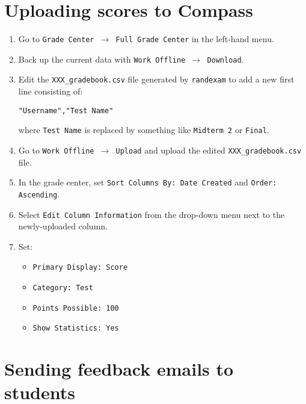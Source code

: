\documentclass{article}
\begin{document}
\section{Uploading scores to Compass}

\begin{enumerate}
\item Go to \texttt{Grade Center $\to$ Full Grade Center} in the
  left-hand menu.
\item Back up the current data with \texttt{Work Offline $\to$
    Download}.
\item Edit the \texttt{XXX_gradebook.csv} file generated by
  \texttt{randexam} to add a new first line consisting of:
  \begin{center}
    \texttt{"Username","Test Name"}
  \end{center}
  where \texttt{Test Name} is replaced by something like
  \texttt{Midterm 2} or \texttt{Final}.
\item Go to \texttt{Work Offline $\to$ Upload} and upload the edited
  \texttt{XXX_gradebook.csv} file.
\item In the grade center, set \texttt{Sort Columns By: Date Created}
  and \texttt{Order: Ascending}.
\item Select \texttt{Edit Column Information} from the drop-down menu
  next to the newly-uploaded column.
\item Set:
  \begin{itemize}
  \item \texttt{Primary Display: Score}
  \item \texttt{Category: Test}
  \item \texttt{Points Possible: 100}
  \item \texttt{Show Statistics: Yes}
  \end{itemize}
\end{enumerate}

\section{Sending feedback emails to students}
\end{document}
